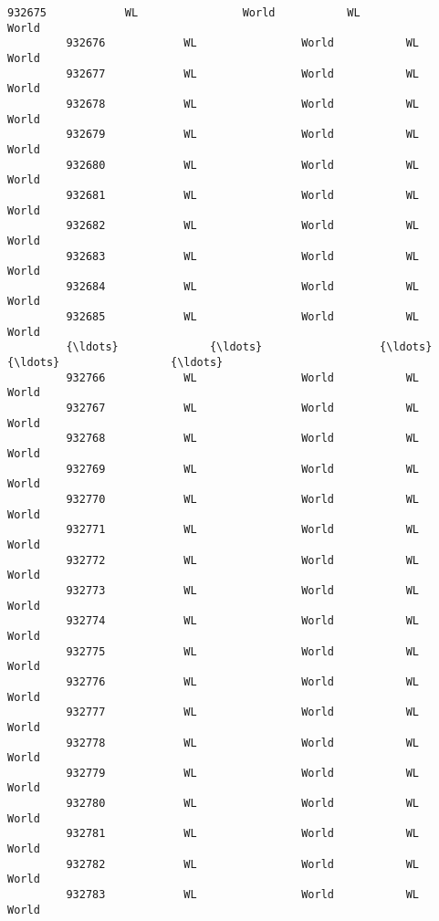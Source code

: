 \documentclass[11pt]{article}
\begin{document}
\begin{Verbatim}[commandchars=\\\{\}]
         932675            WL                World           WL               World   
         932676            WL                World           WL               World   
         932677            WL                World           WL               World   
         932678            WL                World           WL               World   
         932679            WL                World           WL               World   
         932680            WL                World           WL               World   
         932681            WL                World           WL               World   
         932682            WL                World           WL               World   
         932683            WL                World           WL               World   
         932684            WL                World           WL               World   
         932685            WL                World           WL               World   
         {\ldots}              {\ldots}                  {\ldots}          {\ldots}                 {\ldots}   
         932766            WL                World           WL               World   
         932767            WL                World           WL               World   
         932768            WL                World           WL               World   
         932769            WL                World           WL               World   
         932770            WL                World           WL               World   
         932771            WL                World           WL               World   
         932772            WL                World           WL               World   
         932773            WL                World           WL               World   
         932774            WL                World           WL               World   
         932775            WL                World           WL               World   
         932776            WL                World           WL               World   
         932777            WL                World           WL               World   
         932778            WL                World           WL               World   
         932779            WL                World           WL               World   
         932780            WL                World           WL               World   
         932781            WL                World           WL               World   
         932782            WL                World           WL               World   
         932783            WL                World           WL               World   

\end{Verbatim}
\end{document}

